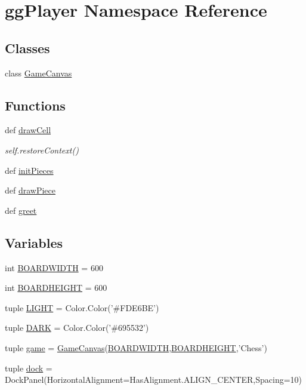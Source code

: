 \hypertarget{namespacegg_player}{\section{gg\-Player Namespace Reference}
\label{namespacegg_player}
}
\subsection*{Classes}
\begin{DoxyCompactItemize}
\item 
class \hyperlink{classgg_player_1_1_game_canvas}{Game\-Canvas}
\end{DoxyCompactItemize}
\subsection*{Functions}
\begin{DoxyCompactItemize}
\item 
def \hyperlink{namespacegg_player_a013239be9b1a5a94145a1fe289f44f5b}{draw\-Cell}
\begin{DoxyCompactList}\small\item\em self.\-restore\-Context() \end{DoxyCompactList}\item 
def \hyperlink{namespacegg_player_aaa0a5328bbcddb8cad57f433205331ac}{init\-Pieces}
\item 
def \hyperlink{namespacegg_player_a47e2d7814019771c50dc3397e7740b35}{draw\-Piece}
\item 
def \hyperlink{namespacegg_player_a8625ebffbbbccde750eaed3160e90a80}{greet}
\end{DoxyCompactItemize}
\subsection*{Variables}
\begin{DoxyCompactItemize}
\item 
int \hyperlink{namespacegg_player_a4054f3b504e92346c8100419c68c97d3}{B\-O\-A\-R\-D\-W\-I\-D\-T\-H} = 600
\item 
int \hyperlink{namespacegg_player_a22ebbb0c34f90b06ea41271eec89d6fe}{B\-O\-A\-R\-D\-H\-E\-I\-G\-H\-T} = 600
\item 
tuple \hyperlink{namespacegg_player_af7675a3029c838866130d1e9fc3c4c49}{L\-I\-G\-H\-T} = Color.\-Color('\#F\-D\-E6\-B\-E')
\item 
tuple \hyperlink{namespacegg_player_ad554292d3744ea74e0523b34b537013b}{D\-A\-R\-K} = Color.\-Color('\#695532')
\item 
tuple \hyperlink{namespacegg_player_a8fdb2fa9bacc3b4e36bf435bf96fa8a5}{game} = \hyperlink{classgg_player_1_1_game_canvas}{Game\-Canvas}(\hyperlink{namespacegg_player_a4054f3b504e92346c8100419c68c97d3}{B\-O\-A\-R\-D\-W\-I\-D\-T\-H},\hyperlink{namespacegg_player_a22ebbb0c34f90b06ea41271eec89d6fe}{B\-O\-A\-R\-D\-H\-E\-I\-G\-H\-T},'Chess')
\item 
tuple \hyperlink{namespacegg_player_ad7968018d930130dfd2fb1a4cb6d6433}{dock} = Dock\-Panel(Horizontal\-Alignment=Has\-Alignment.\-A\-L\-I\-G\-N\-\_\-\-C\-E\-N\-T\-E\-R,Spacing=10)
\end{DoxyCompactItemize}


